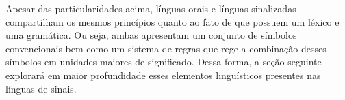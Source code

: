 Apesar das particularidades acima, línguas orais e línguas sinalizadas compartilham os mesmos princípios quanto ao fato de que possuem um léxico e uma gramática. Ou seja, ambas apresentam um conjunto de símbolos convencionais bem como um sistema de regras que rege a combinação desses símbolos em unidades maiores de significado.
Dessa forma, a seção seguinte explorará em maior profundidade esses elementos linguísticos presentes nas línguas de sinais.
















